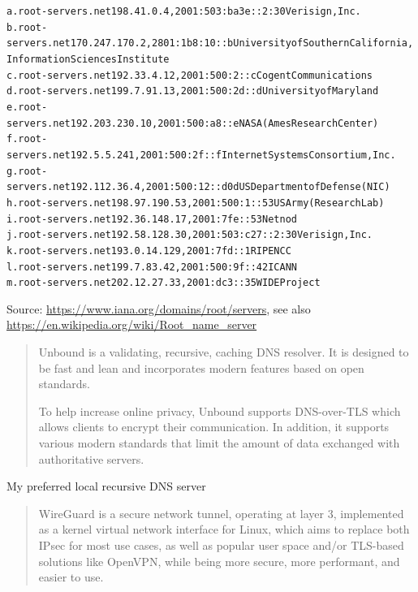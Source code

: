 \documentclass[Screen16to9,17pt]{foils}
\begin{document}
\begin{alltt}\small
a.root-servers.net 198.41.0.4, 2001:503:ba3e::2:30 Verisign, Inc.
b.root-servers.net 170.247.170.2, 2801:1b8:10::b University of Southern California,
Information Sciences Institute
c.root-servers.net 192.33.4.12, 2001:500:2::c Cogent Communications
d.root-servers.net 199.7.91.13, 2001:500:2d::d University of Maryland
e.root-servers.net 192.203.230.10, 2001:500:a8::e NASA (Ames Research Center)
f.root-servers.net 192.5.5.241, 2001:500:2f::f Internet Systems Consortium, Inc.
g.root-servers.net 192.112.36.4, 2001:500:12::d0d US Department of Defense (NIC)
h.root-servers.net 198.97.190.53, 2001:500:1::53 US Army (Research Lab)
i.root-servers.net 192.36.148.17, 2001:7fe::53 Netnod
j.root-servers.net 192.58.128.30, 2001:503:c27::2:30 Verisign, Inc.
k.root-servers.net 193.0.14.129, 2001:7fd::1 RIPE NCC
l.root-servers.net 199.7.83.42, 2001:500:9f::42 ICANN
m.root-servers.net 202.12.27.33, 2001:dc3::35 WIDE Project
\end{alltt}
Source: \url{https://www.iana.org/domains/root/servers}, see also \url{https://en.wikipedia.org/wiki/Root_name_server}







\begin{quote}
Unbound is a validating, recursive, caching DNS resolver. It is designed to be fast and lean and incorporates modern features based on open standards.

To help increase online privacy, Unbound supports DNS-over-TLS which allows clients to encrypt their communication. In addition, it supports various modern standards that limit the amount of data exchanged with authoritative servers.
\end{quote}


My preferred local recursive DNS server



\begin{quote}\small
WireGuard is a secure network tunnel, operating at layer 3, implemented as a kernel virtual network interface for Linux, which aims to replace both IPsec for most use cases, as well as popular user space and/or TLS-based solutions like OpenVPN, while being more secure, more performant, and easier to use.
\end{quote}
\end{document}

